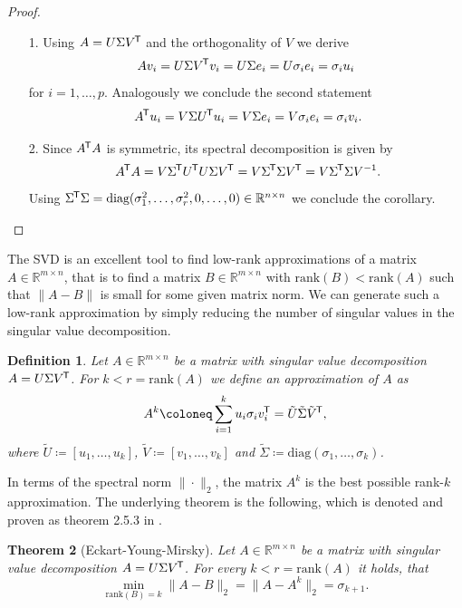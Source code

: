 \documentclass[11pt, a4paper]{article}
\newtheorem{theorem}{Theorem}[section]
\newtheorem{definition}[theorem]{Definition}
\newcommand{\R}{\mathbb{R}}
\newcommand*{\tr}{^{\mkern-1.5mu\mathsf{T}}}
\begin{document}
\begin{proof}
\ 
\begin{itemize}
\item[1.] Using $A=U \Sigma V\tr $ and the orthogonality of $V$ we derive
\[ Av_i = U \Sigma V\tr  v_i = U \Sigma e_i = U \sigma_i e_i = \sigma_i u_i \]
for $i=1, \dots, p$. Analogously we conclude the second statement
\[ A\tr  u_i = V \Sigma U\tr  u_i = V \Sigma e_i = V \sigma_i e_i = \sigma_i v_i. \]
\item[2.] Since $A\tr A$ is symmetric, its spectral decomposition is given by
\[ A\tr A = V \Sigma\tr  U\tr  U \Sigma V\tr  = V \Sigma\tr  \Sigma V\tr  = V \Sigma\tr  \Sigma V^{-1}. \]
Using $\Sigma\tr  \Sigma = \text{diag}(\sigma_1^2, \dots, \sigma_r^2, 0, \dots, 0) \in \R^{n \times n}$ we conclude the corollary. \qedhere
\end{itemize}
\end{proof}

The SVD is an excellent tool to find low-rank approximations of a matrix $A \in \R^{m \times n}$, that is to find a matrix $B \in \R^{m \times n}$ with $\text{rank}(B) < \text{rank}(A)$ such that $\|A -B\|$ is small for some given matrix norm. We can generate such a low-rank approximation by simply reducing the number of singular values in the singular value decomposition.

\begin{definition}
Let $A \in \R^{m \times n}$ be a matrix with singular value decomposition $A=U \Sigma V\tr $. For $k < r = \text{rank}(A)$ we define an approximation of $A$ as
\[ A^k \coloneq \sum_{i=1}^{k} u_i \sigma_i v_i\tr  = \tilde{U} \tilde{\Sigma} \tilde{V}\tr , \]
where $\tilde{U} \coloneq [u_1, \dots, u_k]$, $\tilde{V} \coloneq [v_1, \dots, v_k]$ and $\tilde{\Sigma} \coloneq \text{diag}(\sigma_1, \dots, \sigma_k)$.
\end{definition}

In terms of the spectral norm $\| \cdot \|_2$, the matrix $A^k$ is the best possible rank-$k$ approximation. The underlying theorem is the following, which is denoted and proven as theorem 2.5.3 in \cite{SVD}.

\begin{theorem}[Eckart-Young-Mirsky] \label{thm:eym}
Let $A \in \R^{m \times n}$ be a matrix with singular value decomposition $A= U \Sigma V\tr $. For every $k < r = \text{rank}(A)$ it holds, that
\[ \min_{\text{rank}(B)=k} \big \| A-B \big \|_2 = \big \| A - A^k \big \|_2 = \sigma_{k+1}. \]
\end{theorem}
\end{document}
